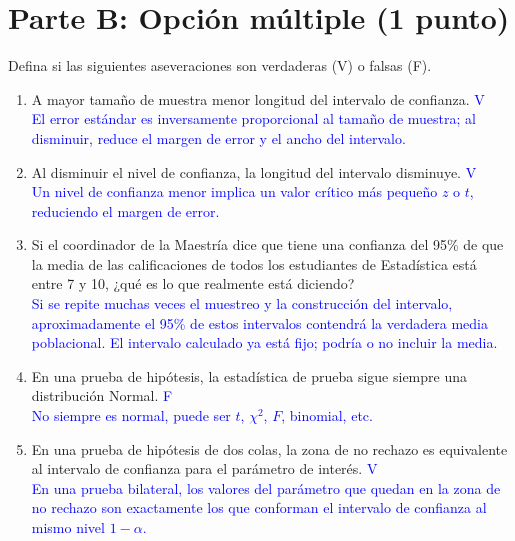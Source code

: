 \documentclass[12pt]{article}
\begin{document}
\section*{Parte B: Opción múltiple (1 punto)}

Defina si las siguientes aseveraciones son verdaderas (V) o falsas (F).

\begin{enumerate}
	\item A mayor tamaño de muestra menor longitud del intervalo de confianza. \hfill \textcolor{blue}{V}\\[0.2cm]
	      \textcolor{blue}{El error estándar es inversamente proporcional al tamaño de muestra; al disminuir, reduce el margen de error y el ancho del intervalo.}
	\item Al disminuir el nivel de confianza, la longitud del intervalo disminuye. \hfill \textcolor{blue}{V}\\[0.2cm]
	      \textcolor{blue}{Un nivel de confianza menor implica un valor crítico más pequeño \(z\) o \(t\), reduciendo el margen de error.}

	\item Si el coordinador de la Maestría dice que tiene una confianza del 95\% de que
	      la media de las calificaciones de todos los estudiantes de Estadística está
	      entre 7 y 10, ¿qué es lo que realmente está diciendo?\\[0.2cm]
	      \textcolor{blue}{Si se repite muchas veces el muestreo y la construcción del intervalo, aproximadamente el 95\% de estos intervalos contendrá la verdadera media poblacional. El intervalo calculado ya está fijo; podría o no incluir la media.}
	\item En una prueba de hipótesis, la estadística de prueba sigue siempre una
	      distribución Normal. \hfill \textcolor{blue}{F}\\[0.2cm]
	      \textcolor{blue}{No siempre es normal, puede ser \(t\), \(\chi^{2}\), \(F\), binomial, etc.}
	\item En una prueba de hipótesis de dos colas, la zona de no rechazo es equivalente
	      al intervalo de confianza para el parámetro de interés. \hfill \textcolor{blue}{V}\\[0.2cm]
	      \textcolor{blue}{En una prueba bilateral, los valores del parámetro que quedan en la zona de no rechazo son exactamente los que conforman el intervalo de confianza al mismo nivel \(1-\alpha\).}
\end{enumerate}
\end{document}
